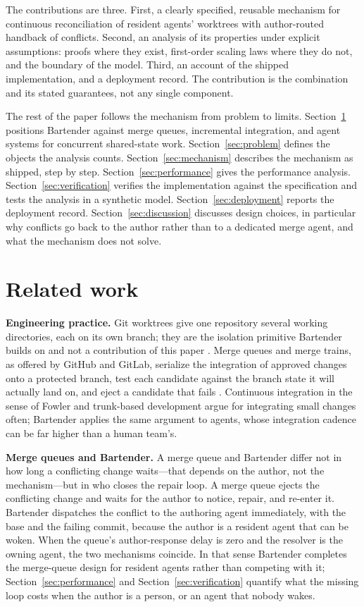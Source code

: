 \documentclass[pdflatex,sn-mathphys-ay]{sn-jnl}
\theoremstyle{thmstyleone}
\theoremstyle{thmstylethree}
\begin{document}
The contributions are three. First, a clearly specified, reusable mechanism for continuous reconciliation of resident agents' worktrees with author-routed handback of conflicts. Second, an analysis of its properties under explicit assumptions: proofs where they exist, first-order scaling laws where they do not, and the boundary of the model. Third, an account of the shipped implementation, and a deployment record. The contribution is the combination and its stated guarantees, not any single component.

The rest of the paper follows the mechanism from problem to limits. Section~\ref{sec:related-work} positions Bartender against merge queues, incremental integration, and agent systems for concurrent shared-state work. Section~\ref{sec:problem} defines the objects the analysis counts. Section~\ref{sec:mechanism} describes the mechanism as shipped, step by step. Section~\ref{sec:performance} gives the performance analysis. Section~\ref{sec:verification} verifies the implementation against the specification and tests the analysis in a synthetic model. Section~\ref{sec:deployment} reports the deployment record. Section~\ref{sec:discussion} discusses design choices, in particular why conflicts go back to the author rather than to a dedicated merge agent, and what the mechanism does not solve.
\section{Related work}\label{sec:related-work}

\textbf{Engineering practice.} Git worktrees give one repository several working directories, each on its own branch; they are the isolation primitive Bartender builds on and not a contribution of this paper \citep{git-worktree}. Merge queues and merge trains, as offered by GitHub and GitLab, serialize the integration of approved changes onto a protected branch, test each candidate against the branch state it will actually land on, and eject a candidate that fails \citep{github-merge-queue,gitlab-merge-trains}. Continuous integration in the sense of Fowler \citep{fowler-continuous-integration} and trunk-based development argue for integrating small changes often; Bartender applies the same argument to agents, whose integration cadence can be far higher than a human team's.

\textbf{Merge queues and Bartender.} A merge queue and Bartender differ not in how long a conflicting change waits---that depends on the author, not the mechanism---but in who closes the repair loop. A merge queue ejects the conflicting change and waits for the author to notice, repair, and re-enter it. Bartender dispatches the conflict to the authoring agent immediately, with the base and the failing commit, because the author is a resident agent that can be woken. When the queue's author-response delay is zero and the resolver is the owning agent, the two mechanisms coincide. In that sense Bartender completes the merge-queue design for resident agents rather than competing with it; Section~\ref{sec:performance} and Section~\ref{sec:verification} quantify what the missing loop costs when the author is a person, or an agent that nobody wakes.
\end{document}
